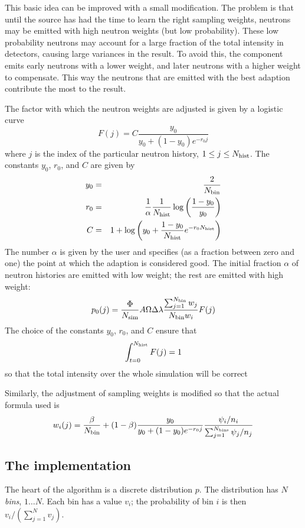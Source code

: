 This basic idea can be improved with a small modification. The problem
is that until the source has had the time to learn the right sampling
weights, neutrons may be emitted with high neutron weights (but low
probability). These low probability neutrons may account for a large fraction of
the total intensity in detectors, causing large variances in the
result. To avoid this, the component emits early neutrons with a lower
weight, and later neutrons with a higher weight to compensate. This way
the neutrons that are emitted with the best adaption contribute the most
to the result.

The factor with which the neutron weights are adjusted is given by a
logistic curve
\begin{equation}
  F(j) = C\frac{y_0}{y_0 + (1 - y_0) e^{-r_0 j}}
\end{equation}
where $j$ is the index of the particular neutron history, $1 \leq j
\leq N_{\rm hist}$. The constants $y_0$, $r_0$, and $C$ are given by
\begin{eqnarray}
  y_0 &=& \frac{2}{N_{\rm bin}} \\
  r_0 &=& \frac{1}{\alpha}\frac{1}{N_{\rm hist}}
     \log\left(\frac{1 - y_0}{y_0}\right) \\
  C &=& 1 + \log\left(y_0 + \frac{1 - y_0}{N_{\rm hist}}
     e^{-r_0 N_{\rm hist}}\right)
\end{eqnarray}
The number $\alpha$ is given by the user and specifies (as a fraction
between zero and one) the point at which the adaption is considered
good. The initial fraction $\alpha$ of neutron histories are emitted
with low weight; the rest are emitted with high weight:
$$ p_0(j) = 
    \frac{\Phi}{N_{\rm sim}} A \Omega \Delta\lambda 
    \frac{\sum_{j=1}^{N_{\rm bin}} w_j}{N_{\rm bin} w_i}
    F(j)
$$
The choice of the constants $y_0$, $r_0$, and $C$ ensure that
$$
\int_{t=0}^{N_{\rm hist}} F(j) = 1
$$
so that the total intensity over the whole simulation will be correct

Similarly, the adjustment of sampling weights is modified so that the
actual formula used is
$$
w_i(j) = \frac{\beta}{N_{\rm bin}} + 
    (1-\beta) \frac{y_0}{y_0 + (1 - y_0) e^{-r_0 j}}
     \frac{\psi_i/n_i}{\sum_{j=1}^{N_{\rm bins}} \psi_j/n_j}
$$

\subsection{The implementation}

The heart of the algorithm is a discrete distribution $p$. The
distribution has $N$ \emph{bins}, $1\ldots N$. Each bin has a value
$v_i$; the probability of bin $i$ is then $v_i/(\sum_{j=1}^N v_j)$.

